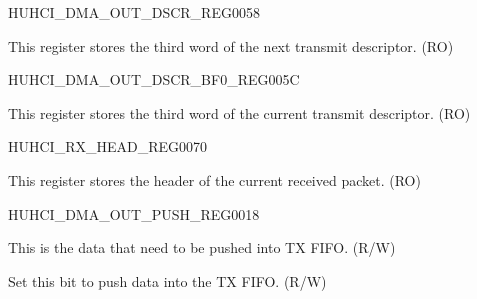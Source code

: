 \begin{register}{H}{UHCI\_DMA\_OUT\_DSCR\_REG}{\hexprefix{}0058}\label{regdesc:UHCIDMAOUTDSCRREG}
%
\regnewline%
\begin{regdesc}\begin{reglist}
\label{fielddesc:UHCIOUTLINKDSCR}\item [UHCI\_OUTLINK\_DSCR] This register stores the third word of the next transmit descriptor. (RO)
\end{reglist}\end{regdesc}
\end{register}


\begin{register}{H}{UHCI\_DMA\_OUT\_DSCR\_BF0\_REG}{\hexprefix{}005C}\label{regdesc:UHCIDMAOUTDSCRBF0REG}
%
\regnewline%
\begin{regdesc}\begin{reglist}
\label{fielddesc:UHCIOUTLINKDSCRBF0}\item [UHCI\_OUTLINK\_DSCR\_BF0] This register stores the third word of the current transmit descriptor. (RO)
\end{reglist}\end{regdesc}
\end{register}


\begin{register}{H}{UHCI\_RX\_HEAD\_REG}{\hexprefix{}0070}\label{regdesc:UHCIRXHEADREG}
%
\regnewline%
\begin{regdesc}\begin{reglist}
\label{fielddesc:UHCIRXHEAD}\item [UHCI\_RX\_HEAD] This register stores the header of the current received packet. (RO)
\end{reglist}\end{regdesc}
\end{register}


\begin{register}{H}{UHCI\_DMA\_OUT\_PUSH\_REG}{\hexprefix{}0018}\label{regdesc:UHCIDMAOUTPUSHREG}
%
%
%
%
\regnewline%
\begin{regdesc}\begin{reglist}
\label{fielddesc:UHCIOUTFIFOWDATA}\item [UHCI\_OUTFIFO\_WDATA] This is the data that need to be pushed into TX FIFO. (R/W)
\label{fielddesc:UHCIOUTFIFOPUSH}\item [UHCI\_OUTFIFO\_PUSH] Set this bit to push data into the TX FIFO. (R/W)
\end{reglist}\end{regdesc}
\end{register}


